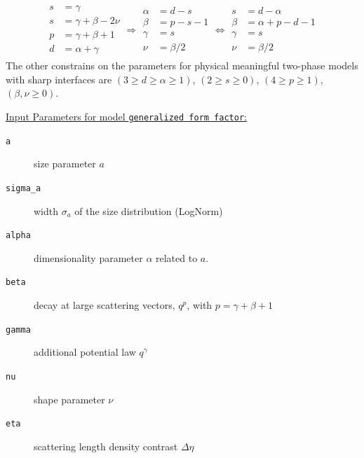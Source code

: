 \begin{align}\label{eq:lesser_generalizedFFparameters}
\begin{array}{rl}
  s &= \gamma \\
 s &= \gamma + \beta -2\nu \\
 p &= \gamma+\beta+1 \\
 d &= \alpha+\gamma
\end{array}
\Rightarrow
\begin{array}{rl}
 \alpha &= d-s \\
 \beta &= p-s-1 \\
 \gamma &= s \\
 \nu &=\beta/2
\end{array}
\Leftrightarrow
\begin{array}{rl}
 s &= d-\alpha \\
 \beta &= \alpha+p-d-1 \\
 \gamma &= s \\
 \nu &=\beta/2
\end{array}
\end{align}
The other constrains on the parameters for physical meaningful two-phase models with sharp interfaces are $(3\geq d\geq \alpha\geq 1)$,  $(2\geq s\geq 0)$, $(4\geq p \geq 1)$, $(\beta,\nu\geq 0)$.

\vspace{5mm}

\underline{Input Parameters for model \texttt{generalized form factor}:}\\
\begin{description}
\item[\texttt{a}] size parameter $a$
\item[\texttt{sigma\_a}] width $\sigma_a$ of the size distribution (LogNorm)
\item[\texttt{alpha}] dimensionality parameter $\alpha$ related to $a$.
\item[\texttt{beta}] decay at large scattering vectors, $q^p$, with $p=\gamma+\beta+1$
\item[\texttt{gamma}] additional potential law $q^\gamma$
\item[\texttt{nu}] shape parameter $\nu$
\item[\texttt{eta}] scattering length density contrast $\Delta\eta$
\end{description}

\vspace{5mm}

